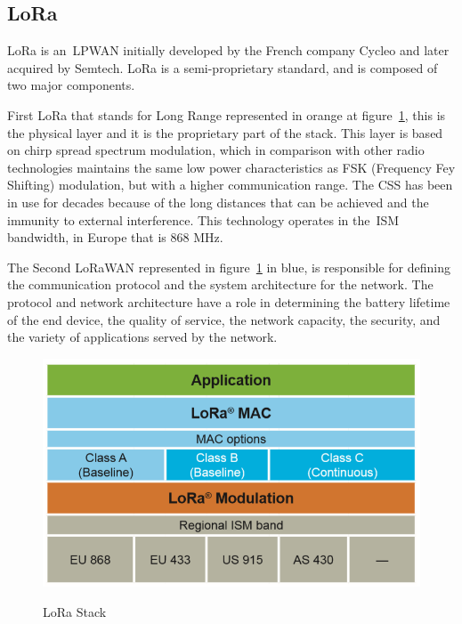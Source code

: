 \subsection{LoRa} %
\label{sec:lora_sota}

LoRa is an~\gls{LPWAN} initially developed by the French company Cycleo and later acquired by Semtech. LoRa is a semi-proprietary standard, and is composed of two major components. 

First LoRa that stands for Long Range represented in orange at figure~\ref{fig:lora_intro}, this is the physical layer and it is the proprietary part of the stack. This layer  is based on chirp spread spectrum modulation, which in comparison with other radio technologies maintains the same low power characteristics as FSK (Frequency Fey Shifting) modulation, but with a higher communication range. The CSS has been in use for decades because of the long distances that can be achieved and the immunity to external interference. This technology operates in the~\gls{ISM} bandwidth, in Europe that is 868 MHz. 

The Second LoRaWAN represented in figure~\ref{fig:lora_intro} in blue, is responsible for defining the communication protocol and the system architecture for the network. The protocol and network architecture have a role in determining the battery lifetime of the end device, the quality of service, the network capacity, the security, and the variety of applications served by the network.

\begin{figure}[htbp]
  \centering
    {\includegraphics[width=0.6\linewidth]{Chapters/Figures/introlora.PNG}}%
  \caption{LoRa Stack~\cite{What_is_LoRa}}
  \label{fig:lora_intro}
\end{figure}

